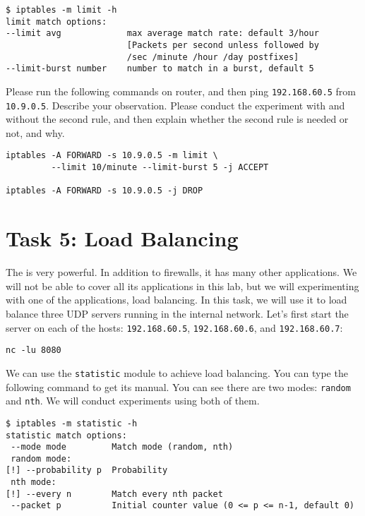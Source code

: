 \begin{lstlisting}
$ iptables -m limit -h
limit match options:
--limit avg             max average match rate: default 3/hour
                        [Packets per second unless followed by
                        /sec /minute /hour /day postfixes]
--limit-burst number    number to match in a burst, default 5
\end{lstlisting}
 

Please run the following commands on router, and then
ping \texttt{192.168.60.5} from \texttt{10.9.0.5}.  
Describe your observation. 
Please conduct the experiment with and without the second rule, 
and then explain whether the second rule is needed or not, and why.

\begin{lstlisting}
iptables -A FORWARD -s 10.9.0.5 -m limit \
         --limit 10/minute --limit-burst 5 -j ACCEPT

iptables -A FORWARD -s 10.9.0.5 -j DROP
\end{lstlisting}



\section{Task 5: Load Balancing}

The \iptables is very powerful. In addition to firewalls,
it has many other applications. We will not be able to 
cover all its applications in this lab, but we will experimenting
with one of the applications, load balancing. In this task,
we will use it to load balance three UDP servers running in the 
internal network. Let's first start the server
on each of the hosts: \texttt{192.168.60.5}, \texttt{192.168.60.6}, and 
\texttt{192.168.60.7}: 

\begin{lstlisting}
nc -lu 8080
\end{lstlisting}

We can use the \texttt{statistic} module to achieve load balancing. 
You can type the following command to get its manual. You can 
see there are two modes: \texttt{random} and \texttt{nth}. 
We will conduct experiments using both of them.

\begin{lstlisting}
$ iptables -m statistic -h 
statistic match options:
 --mode mode         Match mode (random, nth)
 random mode:
[!] --probability p  Probability
 nth mode:
[!] --every n        Match every nth packet
 --packet p          Initial counter value (0 <= p <= n-1, default 0)
\end{lstlisting}
 

